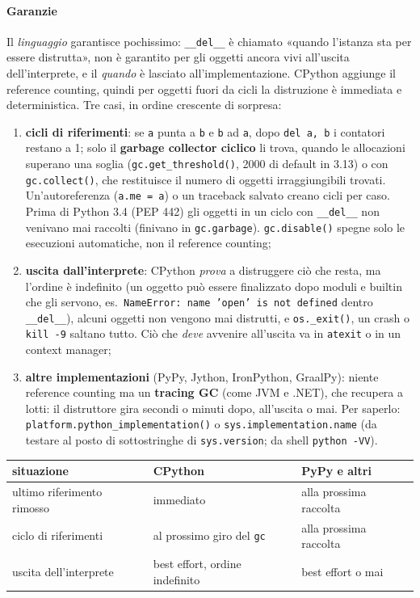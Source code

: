 \documentclass[a4paper,12pt]{article}
\begin{document}
\paragraph{Garanzie} Il \emph{linguaggio} garantisce pochissimo: \texttt{\_\_del\_\_} è chiamato
«quando l'istanza sta per essere distrutta», non è garantito per gli oggetti ancora vivi
all'uscita dell'interprete, e il \emph{quando} è lasciato all'implementazione. CPython aggiunge
il reference counting, quindi per oggetti fuori da cicli la distruzione è immediata e
deterministica. Tre casi, in ordine crescente di sorpresa:
\begin{enumerate}[nosep]
  \item \textbf{cicli di riferimenti}: se \texttt{a} punta a \texttt{b} e \texttt{b} ad
        \texttt{a}, dopo \texttt{del a, b} i contatori restano a 1; solo il \textbf{garbage
        collector ciclico} li trova, quando le allocazioni superano una soglia
        (\texttt{gc.get\_threshold()}, 2000 di default in 3.13) o con \texttt{gc.collect()},
        che restituisce il numero di oggetti irraggiungibili trovati. Un'autoreferenza
        (\texttt{a.me = a}) o un traceback salvato creano cicli per caso. Prima di Python 3.4
        (PEP 442) gli oggetti in un ciclo con \texttt{\_\_del\_\_} non venivano mai raccolti
        (finivano in \texttt{gc.garbage}). \texttt{gc.disable()} spegne solo le esecuzioni
        automatiche, non il reference counting;
  \item \textbf{uscita dall'interprete}: CPython \emph{prova} a distruggere ciò che resta, ma
        l'ordine è indefinito (un oggetto può essere finalizzato dopo moduli e builtin che gli
        servono, es.\ \texttt{NameError: name 'open' is not defined} dentro \texttt{\_\_del\_\_}),
        alcuni oggetti non vengono mai distrutti, e \texttt{os.\_exit()}, un crash o
        \texttt{kill -9} saltano tutto. Ciò che \emph{deve} avvenire all'uscita va in
        \texttt{atexit} o in un context manager;
  \item \textbf{altre implementazioni} (PyPy, Jython, IronPython, GraalPy): niente reference
        counting ma un \textbf{tracing GC} (come JVM e .NET), che recupera a lotti: il
        distruttore gira secondi o minuti dopo, all'uscita o mai. Per saperlo:
        \texttt{platform.python\_implementation()} o \texttt{sys.implementation.name}
        (da testare al posto di sottostringhe di \texttt{sys.version}; da shell
        \texttt{python -VV}).
\end{enumerate}
\begin{center}
\small
\begin{tabular}{|l|l|l|}
\hline
\textbf{situazione} & \textbf{CPython} & \textbf{PyPy e altri} \\
\hline
ultimo riferimento rimosso & immediato & alla prossima raccolta \\
ciclo di riferimenti & al prossimo giro del \texttt{gc} & alla prossima raccolta \\
uscita dell'interprete & best effort, ordine indefinito & best effort o mai \\
\hline
\end{tabular}
\end{center}
\end{document}

